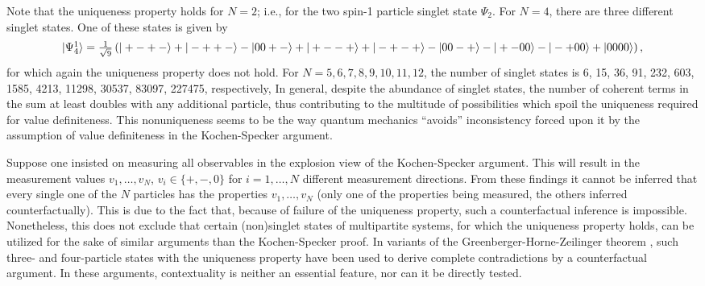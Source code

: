 Note that the uniqueness property holds for $N=2$; i.e., for  the two spin-1 particle
singlet state $\Psi_2$.
For $N=4$, there are three different singlet states.
One of these states is given by
\begin{equation}
\begin{array}{l}
\vert \Psi_4^1 \rangle
= {1\over \sqrt{9}}\left(
\vert +-+- \rangle
+
\vert -++- \rangle
-
\vert 00+-\rangle
+
\vert +--+\rangle
+
\vert -+-+\rangle
-
\vert 00-+\rangle
-
\vert +-00\rangle
-
\vert -+00\rangle
+
\vert 0000\rangle
\right),
\label{2004-qnc-e12}
\end{array}
\end{equation}
for which again the uniqueness property does not hold.
For
$N=5,6,7,8,9,10,11,12$, the number of singlet states is
6, 15, 36, 91, 232, 603, 1585, 4213, 11298, 30537, 83097, 227475, respectively,
In general, despite the abundance of singlet states,
the number of coherent terms in the sum at least doubles
with any additional particle, thus contributing to the multitude of
possibilities which spoil the uniqueness required for value definiteness.
This nonuniqueness seems to be the way quantum mechanics ``avoids''
inconsistency forced upon it by the assumption  of value definiteness
in the Kochen-Specker argument.




Suppose one insisted on measuring all observables in the explosion view of the Kochen-Specker argument.
This will result in the measurement values
$v_1,\ldots , v_N$, $v_i\in \{+,-,0\}$ for $i=1, \ldots ,N$ different measurement directions.
From these findings it cannot be inferred that every single one of the $N$ particles
has the properties $v_1,\ldots , v_N$ (only one of the properties being measured, the others
inferred counterfactually). This is due to the fact that,
because of failure of the uniqueness property, such a counterfactual inference is impossible.
Nonetheless, this does not exclude that certain (non)singlet states of multipartite systems,
for which the uniqueness property holds,
can be utilized for the sake of similar arguments than the Kochen-Specker proof.
In variants of the Greenberger-Horne-Zeilinger theorem
\cite{ghz,ghsz,mermin90b}, such three- and four-particle
states with the uniqueness property have been used to derive
complete contradictions by a counterfactual argument.
In these arguments, contextuality is neither an essential feature, nor can it be directly tested.


